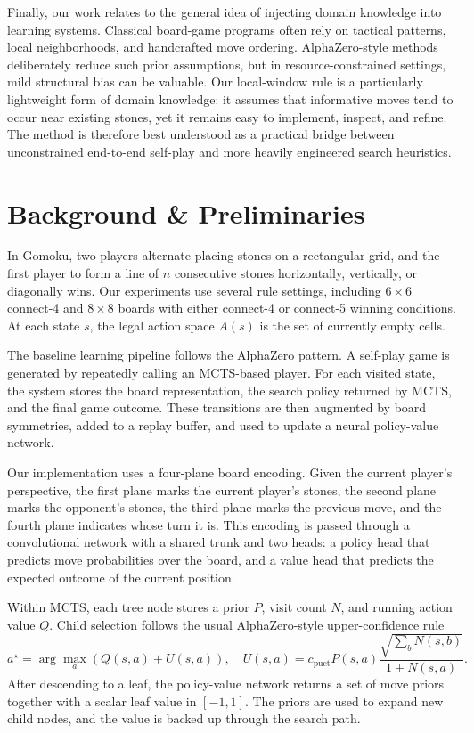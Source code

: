 \documentclass{article}
\begin{document}
Finally, our work relates to the general idea of injecting domain knowledge into learning systems. Classical board-game programs often rely on tactical patterns, local neighborhoods, and handcrafted move ordering. AlphaZero-style methods deliberately reduce such prior assumptions, but in resource-constrained settings, mild structural bias can be valuable. Our local-window rule is a particularly lightweight form of domain knowledge: it assumes that informative moves tend to occur near existing stones, yet it remains easy to implement, inspect, and refine. The method is therefore best understood as a practical bridge between unconstrained end-to-end self-play and more heavily engineered search heuristics.

\section{Background \& Preliminaries}

In Gomoku, two players alternate placing stones on a rectangular grid, and the first player to form a line of \(n\) consecutive stones horizontally, vertically, or diagonally wins. Our experiments use several rule settings, including \(6 \times 6\) connect-4 and \(8 \times 8\) boards with either connect-4 or connect-5 winning conditions. At each state \(s\), the legal action space \(A(s)\) is the set of currently empty cells.

The baseline learning pipeline follows the AlphaZero pattern. A self-play game is generated by repeatedly calling an MCTS-based player. For each visited state, the system stores the board representation, the search policy returned by MCTS, and the final game outcome. These transitions are then augmented by board symmetries, added to a replay buffer, and used to update a neural policy-value network.

Our implementation uses a four-plane board encoding. Given the current player's perspective, the first plane marks the current player's stones, the second plane marks the opponent's stones, the third plane marks the previous move, and the fourth plane indicates whose turn it is. This encoding is passed through a convolutional network with a shared trunk and two heads: a policy head that predicts move probabilities over the board, and a value head that predicts the expected outcome of the current position.

Within MCTS, each tree node stores a prior \(P\), visit count \(N\), and running action value \(Q\). Child selection follows the usual AlphaZero-style upper-confidence rule
\begin{equation}
  a^\star = \arg\max_a \left( Q(s,a) + U(s,a) \right), \quad
  U(s,a) = c_{\text{puct}} P(s,a)\frac{\sqrt{\sum_b N(s,b)}}{1 + N(s,a)}.
\end{equation}
After descending to a leaf, the policy-value network returns a set of move priors together with a scalar leaf value in \([-1,1]\). The priors are used to expand new child nodes, and the value is backed up through the search path.
\end{document}
